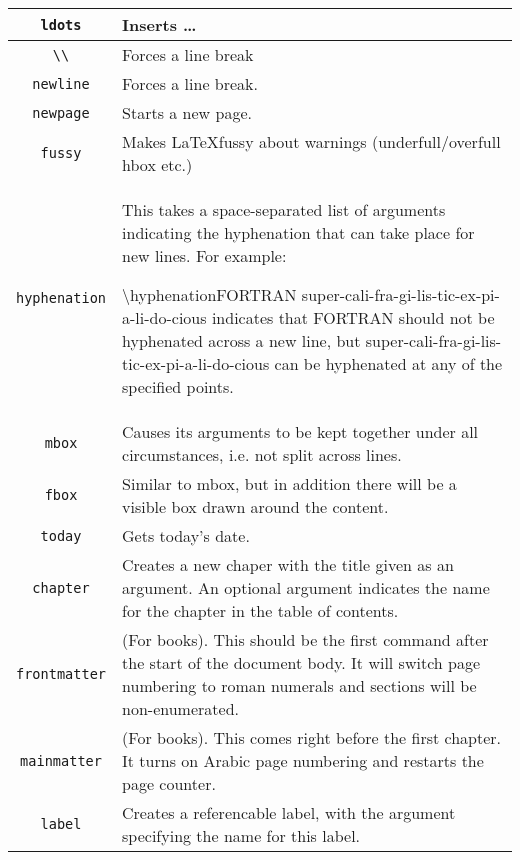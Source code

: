\begin{longtable}{|c|p{}|}
\\
\hline
\verb|ldots| & Inserts \ldots

\\
\hline
\verb|\\| & Forces a line break

\\
\hline
\verb|newline| & Forces a line break.

\\
\hline
\verb|newpage| & Starts a new page.

\\
\hline
\verb|fussy| & Makes \LaTeX fussy about warnings (underfull/overfull hbox etc.)

\\
\hline
\verb|hyphenation| & This takes a space-separated list of arguments indicating the hyphenation that can take place for new lines. 
For example:

\textbackslash{}hyphenation{FORTRAN super-cali-fra-gi-lis-tic-ex-pi-a-li-do-cious} indicates that FORTRAN should not be hyphenated across a new line, but super-cali-fra-gi-lis-tic-ex-pi-a-li-do-cious can be hyphenated at any of the specified points.

\\
\hline
\verb|mbox| & Causes its arguments to be kept together under all circumstances, i.e. not split across lines.

\\
\hline
\verb|fbox| & Similar to mbox, but in addition there will be a visible box drawn around the content.

\\
\hline
\verb|today| & Gets today's date.

\\
\hline
\verb|chapter| & Creates a new chaper with the title given as an argument. An optional argument indicates the name for the chapter in the table of contents.

\\
\hline
\verb|frontmatter| & (For books). This should be the first command after the start of the document body. It will switch page numbering to roman numerals and sections will be non-enumerated.

\\
\hline
\verb|mainmatter| & (For books). This comes right before the first chapter. It turns on Arabic page numbering and restarts the page counter.

\\
\hline
\verb|label| & Creates a referencable label, with the argument specifying the name for this label.


\end{longtable}

